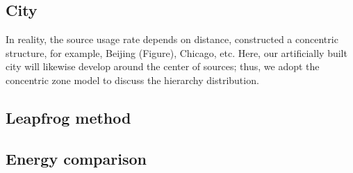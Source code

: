 \documentclass[12pt]{article}
\begin{document}
\begin{multicols}{2}
    \subsection{City}
    In reality, the source usage rate depends on distance, constructed a concentric structure, for example, Beijing (Figure), Chicago, etc. Here, our artificially built city will likewise develop around the center of sources; thus, we adopt the concentric zone model to discuss the hierarchy distribution.
    

    \subsection{Leapfrog method}
    
    \subsection{Energy comparison}
    
\end{multicols}
\end{document}
